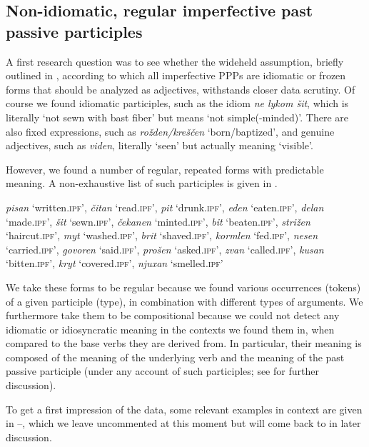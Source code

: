 \documentclass[output=paper,
modfonts,
newtxmath,
hidelinks
]{langscibook}
\begin{document}
\subsection{Non-idiomatic, regular imperfective past passive participles} 
\label{nonidiom}

A first research question was to see whether the wideheld assumption, briefly outlined in , according to which all imperfective PPPs are idiomatic or frozen forms that should be analyzed as adjectives, withstands closer data scrutiny. Of course we found idiomatic participles, such as the idiom \textit{ne lykom šit}, which is literally `not sewn with bast fiber' but means `not simple(-minded)'. There are also fixed expressions, such as \textit{rožden/kreščen} `born/baptized', and genuine adjectives, such as \textit{viden}, literally `seen' but actually meaning `visible'.

However, we found a number of regular, repeated forms with predictable meaning. A non-exhaustive list of such participles is given in .

\ea	\textit{pisan} `written.\textsc{ipf}', \textit{čitan} `read.\textsc{ipf}', \textit{pit} `drunk.\textsc{ipf}', \textit{eden} `eaten.\textsc{ipf}', \textit{delan} `made.\textsc{ipf}', \textit{šit} `sewn.\textsc{ipf}', \textit{čekanen} `minted.\textsc{ipf}', \textit{bit} `beaten.\textsc{ipf}', \textit{strižen} `haircut.\textsc{ipf}', \textit{myt} `washed.\textsc{ipf}', \textit{brit} `shaved.\textsc{ipf}', \textit{kormlen} `fed.\textsc{ipf}', \textit{nesen} `carried.\textsc{ipf}', \textit{govoren} `said.\textsc{ipf}', \textit{prošen} `asked.\textsc{ipf}', \textit{zvan} `called.\textsc{ipf}', \textit{kusan} `bitten.\textsc{ipf}', \textit{kryt} `covered.\textsc{ipf}', \textit{njuxan} `smelled.\textsc{ipf}' \label{list}
\z

\noindent We take these forms to be regular because we found various occurrences (tokens) of a given participle (type), in combination with different types of arguments. We furthermore take them to be compositional because we could not detect any idiomatic or idiosyncratic meaning in the contexts we found them in, when compared to the base verbs they are derived from. In particular, their meaning is composed of the meaning of the underlying verb and the meaning of the past passive participle (under any account of such participles; see  for further discussion). 

To get a first impression of the data, some relevant examples in context are given in --, which we leave uncommented at this moment but will come back to in later discussion. 
\end{document}
